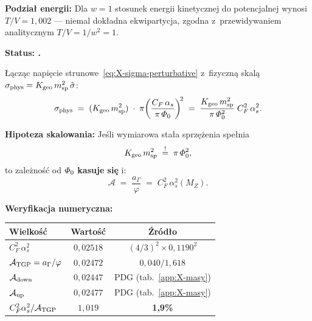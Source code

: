 \begin{proposition}
\medskip\noindent
\textbf{Podzia\l{} energii:}
Dla $w = 1$ stosunek energii kinetycznej do potencjalnej wynosi
$T/V = 1{,}002$ --- niemal dok\l{}adna ekwipartycja, zgodna
z~przewidywaniem analitycznym $T/V = 1/w^2 = 1$.
\end{proposition}

\begin{proposition}[Skasowanie $\PhiZero$
  i~relacja $\mathcal{A} = C_F^2\,\alpha_s^2$ (v47b)]%
\label{prop:X-A-from-tube-tension}
\textbf{Status: .}

\L{}\k{a}cz\k{a}c napi\k{e}cie strunowe~\eqref{eq:X-sigma-perturbative}
z~fizyczn\k{a} skal\k{a} $\sigma_{\rm phys} = K_{\rm geo}\,m_{\rm sp}^2\,
\hat\sigma$:
\begin{equation}\label{eq:X-sigma-physical}
  \sigma_{\rm phys}
  \;=\;
  (K_{\rm geo}\,m_{\rm sp}^2)
  \;\cdot\;
  \pi\!\left(\frac{C_F\,\alpha_s}{\pi\,\varPhi_0}\right)^{\!2}
  \;=\;
  \frac{K_{\rm geo}\,m_{\rm sp}^2}{\pi\,\varPhi_0^2}
  \;C_F^2\,\alpha_s^2.
\end{equation}

\textbf{Hipoteza skalowania:}
Je\'sli wymiarowa sta\l{}a sprz\k{e}\.zenia spe\l{}nia
\begin{equation}\label{eq:X-K-msp-hypothesis}
  K_{\rm geo}\,m_{\rm sp}^2
  \;\stackrel{!}{=}\;
  \pi\,\varPhi_0^2,
\end{equation}
to zale\.zno\'s\'c od $\PhiZero$ \textbf{kasuje si\k{e}} i:
\begin{equation}\label{eq:X-A-equals-CF2-alphas2}
  \boxed{
    \mathcal{A}
    \;=\;
    \frac{a_\Gamma}{\varphi}
    \;=\;
    C_F^2\,\alpha_s^2(M_Z).
  }
\end{equation}

\medskip\noindent
\textbf{Weryfikacja numeryczna:}
\begin{center}\small
\begin{tabular}{@{}lcc@{}}
\toprule
  Wielko\'s\'c & Warto\'s\'c & \'Zr\'od\l{}o \\
\midrule
  $C_F^2\,\alpha_s^2$ & $0{,}02518$ & $(4/3)^2 \times 0{,}1190^2$ \\
  $\mathcal{A}_{\rm TGP} = a_\Gamma/\varphi$ & $0{,}02472$ & $0{,}040/1{,}618$ \\
  $\mathcal{A}_{\rm down}$ & $0{,}02447$ & PDG (tab.~\ref{app:X-masy}) \\
  $\mathcal{A}_{\rm up}$ & $0{,}02477$ & PDG (tab.~\ref{app:X-masy}) \\
\midrule
  $C_F^2\alpha_s^2 / \mathcal{A}_{\rm TGP}$ & $1{,}019$ & \textbf{1{,}9\%} \\
\bottomrule
\end{tabular}
\end{center}


\end{proposition}
